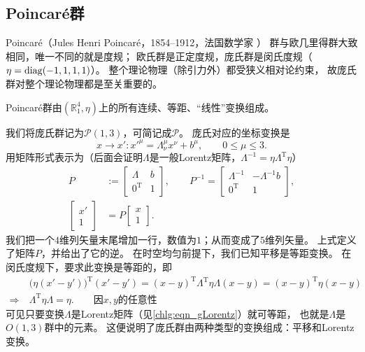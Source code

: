 \subsection{Poincar\'{e}群}\label{chlg:sec_Poincare-group}
Poincar\'{e}（Jules Henri Poincar\'e，1854--1912，法国数学家 ）
群与欧几里得群大致相同，唯一不同的就是度规；
欧氏群是正定度规，庞氏群是闵氏度规（$\eta=\operatorname{diag} (-1,1,1,1)$）。
整个理论物理（除引力外）都受狭义相对论约束，
故庞氏群对整个理论物理都是至关重要的。
\begin{definition}
    Poincar\'{e}群由$(\mathbb{R}^4_1,\eta)$上的所有连续、等距、“线性”变换组成。
\end{definition}
我们将庞氏群记为$\mathcal{P}(1,3)$，可简记成$\mathcal{P}$。
庞氏对应的坐标变换是
\begin{equation}
    x\to x' : x'^{\mu} = \Lambda^\mu_{\nu }x^\nu + b^\mu ,\qquad  0 \leqslant \mu \leqslant 3 .
\end{equation}
用矩阵形式表示为（后面会证明$\Lambda$是一般Lorentz矩阵，$\Lambda^{-1}=\eta \Lambda^{\mathrm{T}} \eta$）
\begin{equation}\label{chlg:eqn_xP5m}
\begin{aligned}
    P&:=\begin{bmatrix}  \Lambda & b \\ 0^{\mathrm{T}} & 1  \end{bmatrix},\qquad P^{-1}=\begin{bmatrix}    \Lambda^{-1} & -\Lambda^{-1} b \\ 0^{\mathrm{T}} & 1    \end{bmatrix},\\
    \begin{bmatrix}  x' \\ 1 \end{bmatrix}&=P\begin{bmatrix}  x \\ 1 \end{bmatrix}.
\end{aligned}
\end{equation}
我们把一个$4$维列矢量末尾增加一行，数值为$1$；从而变成了$5$维列矢量。
上式定义了矩阵$P$，并给出了它的逆。
在时空均匀前提下，我们已知平移是等距变换。
在闵氏度规下，要求此变换是等距的，即
    \begin{align*}
        &\bigl(\eta(x'-y')\bigr)^{\mathrm{T}} (x'-y') = ( x - y )^{\mathrm{T}} \Lambda^{\mathrm{T}} \eta \Lambda ( x - y )= (x-y)^{\mathrm{T}} \eta (x-y)\\
        \Rightarrow\ &\Lambda^{\mathrm{T}} \eta \Lambda = \eta .     \qquad \text{因}x,y \text{的任意性}
    \end{align*}
可见只要变换$\Lambda$是Lorentz矩阵（见\eqref{chlg:eqn_gLorentz}）就可等距，
也就是$\Lambda$是$O(1,3)$群中的元素。
这便说明了庞氏群由两种类型的变换组成：平移和Lorentz变换。

